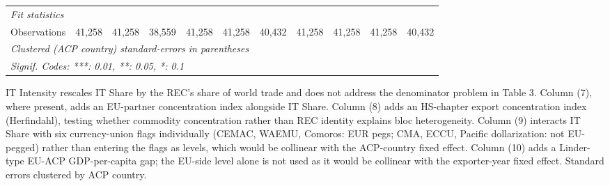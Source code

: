 \begin{tabular}{lcccccccccc}
   \midrule
   \emph{Fit statistics}\\
   Observations                                       & 41,258         & 41,258          & 38,559         & 41,258          & 41,258         & 40,432         & 41,258           & 41,258         & 41,258              & 40,432\\  
   \midrule \midrule
   \multicolumn{11}{l}{\emph{Clustered (ACP country) standard-errors in parentheses}}\\
   \multicolumn{11}{l}{\emph{Signif. Codes: ***: 0.01, **: 0.05, *: 0.1}}\\
\end{tabular}
 
\par \raggedright 
IT Intensity rescales IT Share by the REC's share of world trade and does not address the denominator problem in Table 3. Column (7), where present, adds an EU-partner concentration index alongside IT Share. Column (8) adds an HS-chapter export concentration index (Herfindahl), testing whether commodity concentration rather than REC identity explains bloc heterogeneity. Column (9) interacts IT Share with six currency-union flags individually (CEMAC, WAEMU, Comoros: EUR pegs; CMA, ECCU, Pacific dollarization: not EU-pegged) rather than entering the flags as levels, which would be collinear with the ACP-country fixed effect. Column (10) adds a Linder-type EU-ACP GDP-per-capita gap; the EU-side level alone is not used as it would be collinear with the exporter-year fixed effect. Standard errors clustered by ACP country.
\par\endgroup


